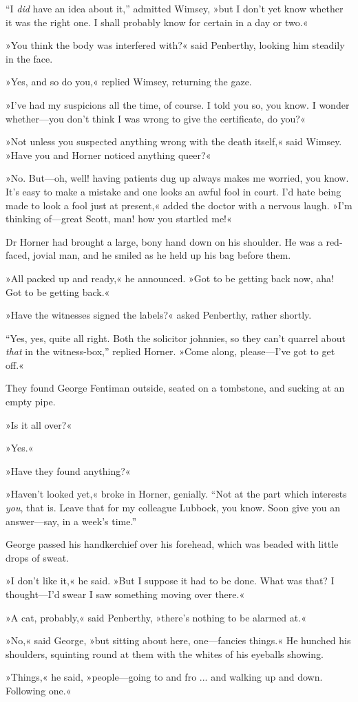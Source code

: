 \enquote{I \textit{did} have an idea about it,} admitted Wimsey, »but I don't yet know whether it was the right one. I shall probably know for certain in a day or two.«

»You think the body was interfered with?« said Penberthy, looking him steadily in the face.

»Yes, and so do you,« replied Wimsey, returning the gaze.

»I've had my suspicions all the time, of course. I told you so, you know. I wonder whether\allowbreak---\allowbreak you don't think I was wrong to give the certificate, do you?«

»Not unless you suspected anything wrong with the death itself,« said Wimsey. »Have you and Horner noticed anything queer?«

»No. But\allowbreak---\allowbreak oh, well! having patients dug up always makes me worried, you know. It's easy to make a mistake and one looks an awful fool in court. I'd hate being made to look a fool just at present,« added the doctor with a nervous laugh. »I'm thinking of\allowbreak---\allowbreak great Scott, man! how you startled me!«

Dr Horner had brought a large, bony hand down on his shoulder. He was a red-faced, jovial man, and he smiled as he held up his bag before them.

»All packed up and ready,« he announced. »Got to be getting back now, aha! Got to be getting back.«

»Have the witnesses signed the labels?« asked Penberthy, rather shortly.

\enquote{Yes, yes, quite all right. Both the solicitor johnnies, so they can't quarrel about \textit{that} in the witness-box,} replied Horner. »Come along, please\allowbreak---\allowbreak I've got to get off.«

They found George Fentiman outside, seated on a tombstone, and sucking at an empty pipe.

»Is it all over?«

»Yes.«

»Have they found anything?«

»Haven't looked yet,« broke in Horner, genially. \enquote{Not at the part which interests \textit{you}, that is. Leave that for my colleague Lubbock, you know. Soon give you an answer\allowbreak---\allowbreak say, in a week's time.}

George passed his handkerchief over his forehead, which was beaded with little drops of sweat.

»I don't like it,« he said. »But I suppose it had to be done. What was that? I thought\allowbreak---\allowbreak I'd swear I saw something moving over there.«

»A cat, probably,« said Penberthy, »there's nothing to be alarmed at.«

»No,« said George, »but sitting about here, one\allowbreak---\allowbreak fancies things.« He hunched his shoulders, squinting round at them with the whites of his eyeballs showing.

»Things,« he said, »people\allowbreak---\allowbreak going to and fro ... and walking up and down. Following one.«